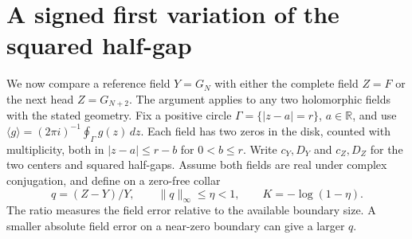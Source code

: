 \section{A signed first variation of the squared half-gap}\label{sec:signed}
We now compare a reference field \(Y=G_N\) with either the complete field \(Z=F\) or the next head \(Z=G_{N+2}\). The argument applies to any two holomorphic fields with the stated geometry. Fix a positive circle \(\Gamma=\{|z-a|=r\}\), \(a\in\mathbb R\), and use \(\langle g\rangle=(2\pi i)^{-1}\oint_\Gamma g(z)\,dz\). Each field has two zeros in the disk, counted with multiplicity, both in \(|z-a|\le r-b\) for \(0<b\le r\). Write \(c_Y,D_Y\) and \(c_Z,D_Z\) for the two centers and squared half-gaps. Assume both fields are real under complex conjugation, and define on a zero-free collar
\begin{equation}
 q=(Z-Y)/Y,\qquad \|q\|_{\infty}\le\eta<1,\qquad K=-\log(1-\eta).
 \label{eq:q}
\end{equation}
The ratio measures the field error relative to the available boundary size. A smaller absolute field error on a near-zero boundary can give a larger \(q\).

